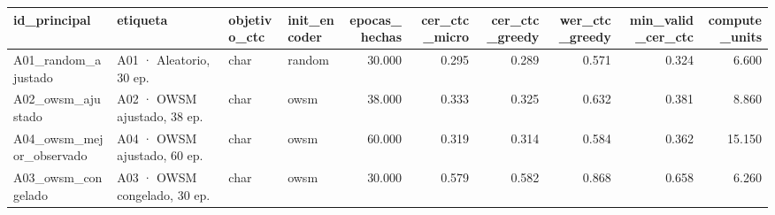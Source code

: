 \begin{tabular}{llllrrrrrr}
\toprule
id_principal & etiqueta & objetivo_ctc & init_encoder & epocas_hechas & cer_ctc_micro & cer_ctc_greedy & wer_ctc_greedy & min_valid_cer_ctc & compute_units \\
\midrule
A01_random_ajustado & A01 · Aleatorio, 30 ep. & char & random & 30.000 & 0.295 & 0.289 & 0.571 & 0.324 & 6.600 \\
A02_owsm_ajustado & A02 · OWSM ajustado, 38 ep. & char & owsm & 38.000 & 0.333 & 0.325 & 0.632 & 0.381 & 8.860 \\
A04_owsm_mejor_observado & A04 · OWSM ajustado, 60 ep. & char & owsm & 60.000 & 0.319 & 0.314 & 0.584 & 0.362 & 15.150 \\
A03_owsm_congelado & A03 · OWSM congelado, 30 ep. & char & owsm & 30.000 & 0.579 & 0.582 & 0.868 & 0.658 & 6.260 \\
\bottomrule
\end{tabular}
